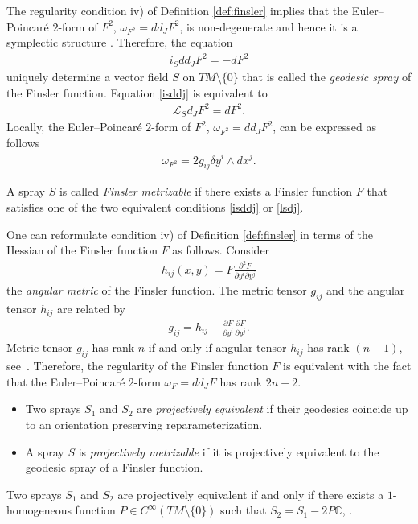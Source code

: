 \documentclass[pdftex]{sigma}
\numberwithin{equation}{section}
\begin{document}
The regularity condition iv) of Def\/inition \ref{def:finsler} implies that the
Euler--Poincar\'e $2$-form of $F^2$, $\omega_{F^2}=dd_JF^2$, is non-degenerate
and hence it is a symplectic structure \cite{deleon89, morandi90}. Therefore, the equation
\begin{gather} i_Sdd_JF^2=-dF^2 \label{isddj}
\end{gather}
uniquely determine a vector f\/ield $S$ on $TM\setminus\{0\}$ that is called the
\emph{geodesic spray} of the Finsler function. Equation \eqref{isddj}
is equivalent to
\begin{gather} \mathcal{L}_Sd_JF^2=dF^2. \label{lsdj}
\end{gather}
Locally, the Euler--Poincar\'e $2$-form of $F^2$, $\omega_{F^2}=dd_JF^2$, can
be expressed as follows
\begin{gather*}
\omega_{F^2}=2g_{ij}\delta y^i \wedge dx^j. %
\end{gather*}
\begin{Definition} \label{defn:finsler_metr}
A spray $S$ is called \emph{Finsler metrizable} if there exists a
Finsler function $F$ that satisf\/ies one of the two equivalent
conditions \eqref{isddj} or \eqref{lsdj}.
\end{Definition}
One can reformulate condition iv) of Def\/inition \ref{def:finsler}
in terms of the Hessian of the Finsler function $F$ as follows.
Consider
\begin{gather*}
h_{ij}(x,y)=F\frac{\partial^2 F}{\partial y^i\partial y^j}
\end{gather*} the \emph{angular metric} of the Finsler function.
The metric tensor $g_{ij}$ and the angular tensor $h_{ij}$ are
related by
\begin{gather*}
g_{ij}=h_{ij} + \frac{\partial F}{\partial y^i} \frac{\partial
F}{\partial y^j}. %
\end{gather*} Metric tensor
$g_{ij}$ has rank $n$ if and only if angular tensor $h_{ij}$ has
rank $(n-1)$, see~\cite{matsumoto86}. Therefore, the regularity of
the Finsler function $F$ is equivalent with the fact that the
Euler--Poincar\'e $2$-form $\omega_{F}=dd_JF$ has rank $2n-2$.
\begin{Definition}\qquad
\begin{itemize} \itemsep=0pt \item[i)] Two sprays $S_1$ and $S_2$ are \emph{projectively equivalent}
if their geodesics coincide up to an orientation preserving
reparameterization. \item[ii)] A spray $S$ is \emph{projectively
metrizable} if it is projectively equivalent to the geodesic spray
of a Finsler function.
\end{itemize}
\end{Definition}
Two sprays $S_1$ and $S_2$ are projectively equivalent if and only
if there exists a $1$-homogeneous function $P\in
C^{\infty}(TM\setminus\{0\})$ such that $S_2=S_1-2P\mathbb{C}$,
\cite{aim93, shen01}.
\end{document}
